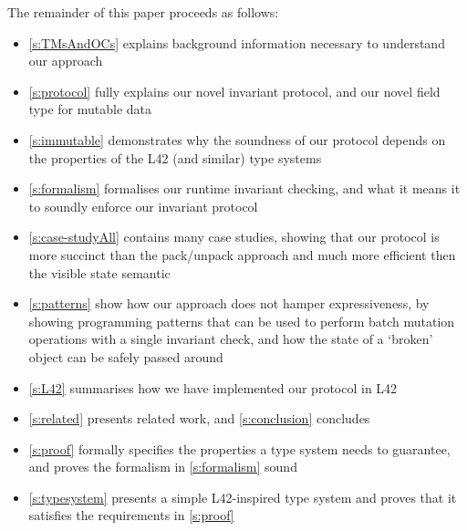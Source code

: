 The remainder of this paper proceeds as follows:
\begin{itemize}
	\item \autoref{s:TMsAndOCs} explains background information necessary to understand our approach
	\item \autoref{s:protocol} fully explains our novel invariant protocol, and our novel field type for mutable data
	\item \autoref{s:immutable} demonstrates why the soundness of our protocol depends on the properties of the L42 (and similar) type systems
	\item \autoref{s:formalism} formalises our runtime invariant checking, and what it means it to soundly enforce our invariant protocol
	\item \autoref{s:case-studyAll} contains many case studies, showing that our protocol is more succinct than the pack/unpack approach and much more efficient then the visible state semantic
	\item \autoref{s:patterns} show how our approach does not hamper expressiveness, by showing programming patterns that can be used to perform batch mutation operations with a single invariant check, and how the state of a `broken' object can be safely passed around
	\item \autoref{s:L42} summarises how we have implemented our protocol in L42
	\item \autoref{s:related} presents related work, and \autoref{s:conclusion} concludes
	\item \autoref{s:proof} formally specifies the properties a type system needs to guarantee, and proves the formalism in \autoref{s:formalism} sound
	\item \autoref{s:typesystem} presents a simple L42-inspired type system and proves that it satisfies the requirements in \autoref{s:proof}	
\end{itemize}




